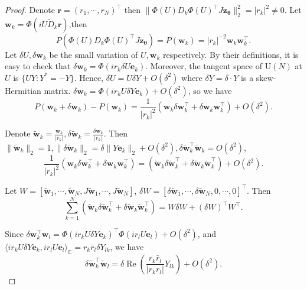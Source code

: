 \documentclass{amsart}
\theoremstyle{plain}
\theoremstyle{definition}
\theoremstyle{remark}
\newcommand{\CC}{\mathbb{C}}
\begin{document}
\begin{proof}
    Denote $\bm r=(r_1,\cdots,r_N)^\top$ then $\|\Phi(U) D_k\Phi(U)^\top J\bm{z}_{\bm\theta}\|_2^2=|r_k|^2\neq 0$. Let $\bm{w}_k=\Phi(iU\tilde D_k\bm r)$,then
\begin{equation}
    P(\Phi(U) D_k\Phi(U)^\top J\bm{z}_{\bm\theta})=P(\bm{w}_k)=|r_k|^{-2}\bm{w}_k\bm{w}_k^\top.
\end{equation}
 Let $\delta U,\delta\bm{w}_k$ be the small variation of $U,\bm{w}_k$ respectively. By their definitions, it is easy to check that $\delta\bm{w}_k=\Phi(ir_k\delta U\bm e_k)$. Moreover, the tangent space of $\mathrm U(N)$ at $U$ is $\{UY:Y^*=-Y\}$. Hence, $\delta U=U\delta Y+O(\delta^2)$ where $\delta Y=\delta\cdot Y$ is a skew-Hermitian matrix.  $\delta\bm{w}_k=\Phi(ir_kU\delta Y\bm e_k)+O(\delta^2)$, so we have 
\begin{equation}
\label{eq:Project error}
    P(\bm{w}_k+\delta\bm{w}_k)-P(\bm{w}_k)=\frac{1}{|r_k|^2}(\bm{w}_k\delta\bm{w}_k^\top+\delta\bm{w}_k\bm{w}_k^\top)+O(\delta^2).
\end{equation}

Denote $\tilde{\bm{w}}_k=\frac{\bm{w}_k}{|r_k|},\delta\tilde{\bm{w}}_k=\frac{\delta\bm{w}_k}{|r_k|}$. Then $\|\tilde{\bm{w}}_k\|_2=1,\|\delta\tilde{\bm{w}}_k\|_2=\delta\|Y\bm e_k\|_2+O(\delta^2),\delta\tilde{\bm{w}}_k^\top\tilde{\bm{w}}_k=O(\delta^2)$, 
\begin{equation}
    \frac{1}{|r_k|^2}(\bm{w}_k\delta\bm{w}_k^\top+\delta\bm{w}_k\bm{w}_k^\top)=(\tilde{\bm{w}}_k\delta\tilde{\bm{w}}_k^\top+\delta\tilde{\bm{w}}_k\tilde{\bm{w}}_k^\top)+O(\delta^2).
\end{equation}

Let $W=[\tilde{\bm{w}}_1,\cdots,\tilde{\bm{w}}_N, J\tilde{\bm{w}}_1,\cdots,J\tilde{\bm{w}}_N]$, $\delta W=[\delta\tilde{\bm{w}}_1,\cdots,\delta\tilde{\bm{w}}_N,0,\cdots,0]^\top$. Then 
\begin{equation}
\label{eq:error matrix form}
   \sum\limits_{k=1}^N(\tilde{\bm{w}}_k\delta\tilde{\bm{w}}_k^\top+\delta\tilde{\bm{w}}_k\tilde{\bm{w}}_k^\top)=W\delta W+(\delta W)^\top W^\top.
\end{equation}

 Since $\delta\bm{w}_k^\top\bm{w}_l=\Phi(ir_kU\delta Y\bm e_k)^\top\Phi(ir_lU\bm e_l)+O(\delta^2)$, and $\langle ir_kU\delta Y\bm e_k,ir_l U\bm e_l\rangle_{\CC}=r_k\bar r_l\delta Y_{lk}$, we have
 \begin{equation}
     \delta\tilde{\bm{w}}_k^\top\tilde{\bm{w}}_l=\delta\operatorname{Re}(\frac{r_k\bar r_l}{|r_kr_l|}Y_{lk})+O(\delta^2).
 \end{equation}


\end{proof}
\end{document}
